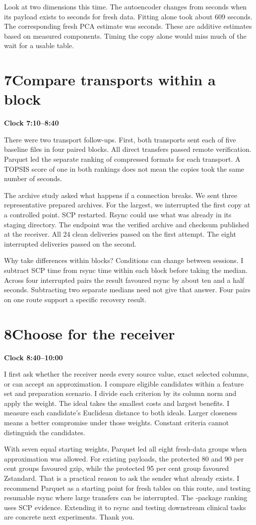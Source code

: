 \documentclass[11pt,a4paper]{article}
\newcommand{\cue}[3]{\section*{\color{forest}#1\quad #2}\textbf{Clock #3}\par}
\begin{document}
Look at two dimensions this time. The autoencoder changes from \studyAeExisting{} seconds when its payload exists to \studyAeFresh{} seconds for fresh data. Fitting alone took about 609 seconds. The corresponding fresh PCA estimate was \studyPcaFresh{} seconds. These are additive estimates based on measured components. Timing the copy alone would miss much of the wait for a usable table.

\newpage
\cue{7}{Compare transports within a block}{7:10--8:40}
There were two transport follow-ups. First, both transports sent each of five baseline files in four paired blocks. All \studyDirect{} direct transfers passed remote verification. Parquet led the separate ranking of compressed formats for each transport. A TOPSIS score of one in both rankings does not mean the copies took the same number of seconds.

The archive study asked what happens if a connection breaks. We sent three representative prepared archives. For the largest, we interrupted the first copy at a controlled point. SCP restarted. Rsync could use what was already in its staging directory. The endpoint was the verified archive and checksum published at the receiver. All 24 clean deliveries passed on the first attempt. The eight interrupted deliveries passed on the second.

Why take differences within blocks? Conditions can change between sessions. I subtract SCP time from rsync time within each block before taking the median. Across four interrupted pairs the result favoured rsync by about ten and a half seconds. Subtracting two separate medians need not give that answer. Four pairs on one route support a specific recovery result.

\cue{8}{Choose for the receiver}{8:40--10:00}
I first ask whether the receiver needs every source value, exact selected columns, or can accept an approximation. I compare eligible candidates within a feature set and preparation scenario. I divide each criterion by its column norm and apply the weight. The ideal takes the smallest costs and largest benefits. I measure each candidate's Euclidean distance to both ideals. Larger closeness means a better compromise under those weights. Constant criteria cannot distinguish the candidates.

With seven equal starting weights, Parquet led all eight fresh-data groups when approximation was allowed. For existing payloads, the protected 80 and 90 per cent groups favoured gzip, while the protected 95 per cent group favoured Zstandard. That is a practical reason to ask the sender what already exists. I recommend Parquet as a starting point for fresh tables on this route, and testing resumable rsync where large transfers can be interrupted. The \studyPackages{}-package ranking uses SCP evidence. Extending it to rsync and testing downstream clinical tasks are concrete next experiments. Thank you.
\end{document}
